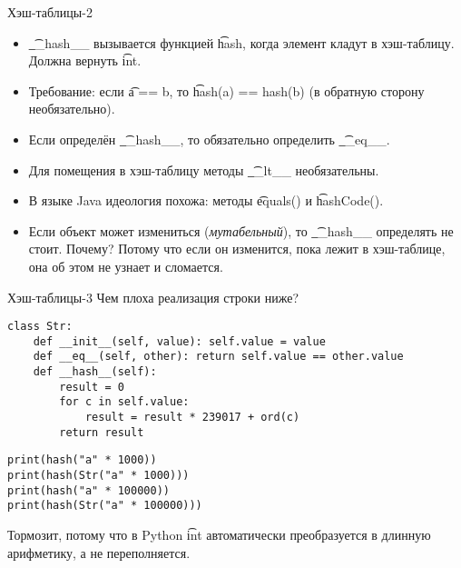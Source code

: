 \begin{frame}{Хэш-таблицы-2}
	\begin{itemize}
		\item
			\t{\_\_hash\_\_} вызывается функцией \t{hash}, когда элемент кладут в хэш-таблицу.
			Должна вернуть \t{int}.
		\item
			Требование: если \t{a == b}, то \t{hash(a) == hash(b)} (в обратную сторону необязательно).
		\item
			Если определён \t{\_\_hash\_\_}, то обязательно определить \t{\_\_eq\_\_}.
		\item
			Для помещения в хэш-таблицу методы \t{\_\_lt\_\_} необязательны.
		\item
			В языке Java идеология похожа: методы \t{equals()} и \t{hashCode()}.
		\item
			Если объект может измениться (\textit{мутабельный}), то \t{\_\_hash\_\_} определять не стоит.
			Почему?
			\pause
			Потому что если он изменится, пока лежит в хэш-таблице, она об этом не узнает и сломается.
	\end{itemize}
\end{frame}

\begin{frame}[fragile]{Хэш-таблицы-3}
	Чем плоха реализация строки ниже?
\begin{verbatim}
class Str:
    def __init__(self, value): self.value = value
    def __eq__(self, other): return self.value == other.value
    def __hash__(self):
        result = 0
        for c in self.value:
            result = result * 239017 + ord(c)
        return result
\end{verbatim}
	\pause
\begin{verbatim}
print(hash("a" * 1000))
print(hash(Str("a" * 1000)))
print(hash("a" * 100000))
print(hash(Str("a" * 100000)))
\end{verbatim}
	\pause
	Тормозит, потому что в Python \t{int} автоматически преобразуется в длинную арифметику,
	а не переполняется.
\end{frame}
